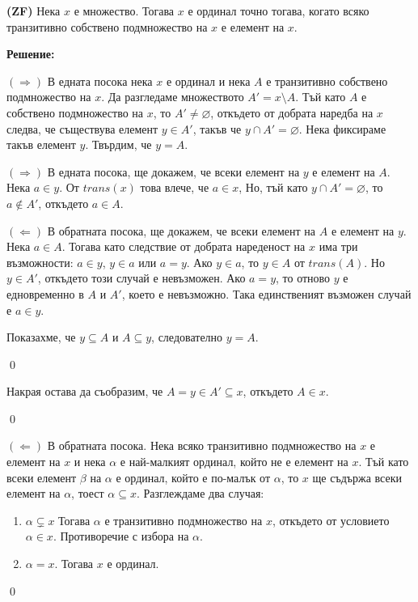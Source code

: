 \begin{problem}
\textbf{(ZF)}
Нека $x$ е множество. Тогава $x$ е ординал точно тогава,
когато всяко транзитивно собствено подмножество на $x$ е елемент на $x$.
\end{problem}

\textbf{Решение:}

\smallbreak
\quad
$(\Rightarrow)$
В едната посока нека $x$ е ординал и нека $A$ е транзитивно собствено подмножество на $x$.
Да разгледаме множеството $A' = x \setminus A$.
Тъй като $A$ е собствено подмножество на $x$, то $A' \neq \varnothing$,
откъдето от добрата наредба на $x$ следва, че съществува елемент $y \in A'$, такъв че $y \cap A' = \varnothing$.
Нека фиксираме такъв елемент $y$.
Твърдим, че $y = A$.

\begin{tcolorbox}[mybox={Доказателство:}]
\quad
$(\Rightarrow)$ В едната посока, ще докажем, че всеки елемент на $y$ е елемент на $A$.
Нека $a \in y$. От $trans(x)$ това влече, че $a \in x$,
Но, тъй като $y \cap A' = \varnothing$, то $a \notin A'$, откъдето $a \in A$.

\quad
$(\Leftarrow)$ В обратната посока, ще докажем, че всеки елемент на $A$ е елемент на $y$.
Нека $a \in A$. Тогава като следствие от добрата нареденост на $x$ има три възможности:
$a \in y$, $y \in a$ или $a = y$.
Ако $y \in a$, то $y \in A$ от $trans(A)$.
Но $y \in A'$, откъдето този случай е невъзможен.
Ако $a = y$, то отново $y$ е едновременно в $A$ и $A'$, което е невъзможно.
Така единственият възможен случай е $a \in y$.

\quad
Показахме, че $y \subseteq A$ и $A \subseteq y$, следователно $y = A$.

\qed
\end{tcolorbox}

\quad
Накрая остава да съобразим, че $A = y \in A' \subseteq x$, откъдето $A \in x$.

\qed


\quad
$(\Leftarrow)$ В обратната посока.
Нека всяко транзитивно подмножество на $x$ е елемент на $x$
и нека $\alpha$ е най-малкият ординал, който не е елемент на $x$.
Тъй като всеки елемент $\beta$ на $\alpha$ е ординал, който е по-малък от $\alpha$,
то $x$ ще съдържа всеки елемент на $\alpha$, тоест $\alpha \subseteq x$.
Разглеждаме два случая:
\begin{enumerate}
\item
$\alpha \subsetneq x$
Тогава $\alpha$ е транзитивно подмножество на $x$, откъдето от условието $\alpha \in x$.
Противоречие с избора на $\alpha$.

\item
$\alpha = x$. Тогава $x$ е ординал.
\end{enumerate}

\qed

